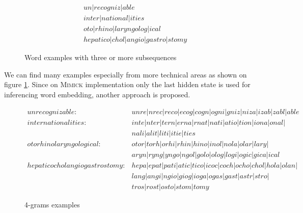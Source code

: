         \begin{figure}
            \begin{align*}
                &un \vert recogniz \vert able \\
                &inter \vert national \vert ities \\
                &oto \vert rhino \vert laryngolog \vert ical \\
                &hepatico \vert chol \vert angio \vert gastro \vert stomy
            \end{align*}
            \caption{Word examples with three or more subsequences}
            \label{fig:subsequence}
        \end{figure}

        We can find many examples especially from more technical areas
        as shown on figure \ref{fig:subsequence}. Since on
        \textsc{Mimick} \citep{mimicking2017Pinter} implementation only
        the last hidden state is used for inferencing word embedding,
        another approach is proposed.

        \begin{figure}
            \begin{align*}
                unrecognizable : &unre \vert nrec \vert reco \vert ecog \vert cogn \vert ogni \vert gniz \vert niza \vert izab \vert zabl \vert able\\
                internationalities : &inte \vert nter \vert tern \vert erna \vert rnat \vert nati \vert atio \vert tion \vert iona \vert onal \vert \\
                &nali \vert alit \vert liti \vert itie \vert ties\\
                otorhinolaryngological : &otor \vert torh \vert orhi \vert rhin \vert hino \vert inol \vert nola \vert olar \vert lary \vert \\
                &aryn \vert ryng \vert yngo \vert ngol \vert golo \vert olog \vert logi \vert ogic \vert gica \vert ical\\
                hepaticocholangiogastrostomy : &hepa \vert epat \vert pati \vert atic \vert tico \vert icoc \vert coch \vert ocho \vert chol \vert hola \vert olan \vert\\
                &lang \vert angi \vert ngio \vert giog \vert ioga \vert ogas \vert gast \vert astr \vert stro \vert\\
                &tros \vert rost \vert osto \vert stom \vert tomy
            \end{align*}
            \caption{4-grams examples}
            \label{fig:4grams}
        \end{figure}

